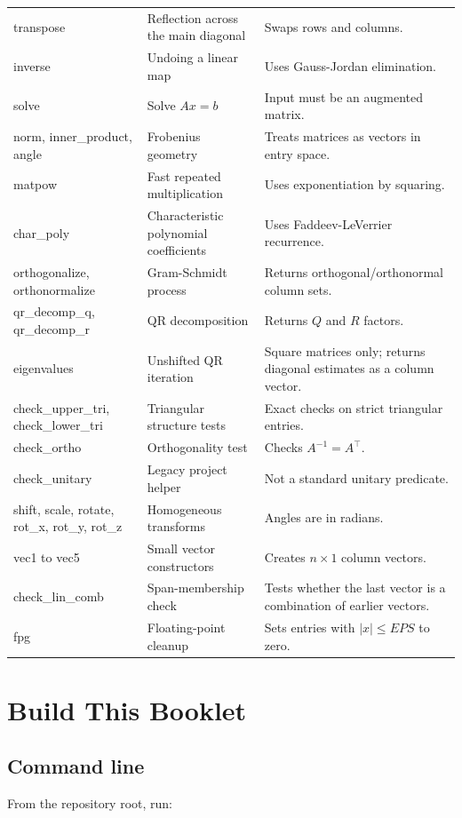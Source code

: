 \documentclass[11pt,a4paper,openany]{book}
\def\code#1{#1}%
\DeclareRobustCommand{\code}[1]{\texttt{\detokenize{#1}}}
\begin{document}
\begin{longtable}{@{}p{}p{}p{}@{}}
\code{transpose} & Reflection across the main diagonal & Swaps rows and columns. \\
\code{inverse} & Undoing a linear map & Uses Gauss-Jordan elimination. \\
\code{solve} & Solve \(Ax=b\) & Input must be an augmented matrix. \\
\code{norm}, \code{inner_product}, \code{angle} & Frobenius geometry & Treats matrices as vectors in entry space. \\
\code{matpow} & Fast repeated multiplication & Uses exponentiation by squaring. \\
\code{char_poly} & Characteristic polynomial coefficients & Uses Faddeev-LeVerrier recurrence. \\
\code{orthogonalize}, \code{orthonormalize} & Gram-Schmidt process & Returns orthogonal/orthonormal column sets. \\
\code{qr_decomp_q}, \code{qr_decomp_r} & QR decomposition & Returns \(Q\) and \(R\) factors. \\
\code{eigenvalues} & Unshifted QR iteration & Square matrices only; returns diagonal estimates as a column vector. \\
\code{check_upper_tri}, \code{check_lower_tri} & Triangular structure tests & Exact checks on strict triangular entries. \\
\code{check_ortho} & Orthogonality test & Checks \(A^{-1}=A^\top\). \\
\code{check_unitary} & Legacy project helper & Not a standard unitary predicate. \\
\code{shift}, \code{scale}, \code{rotate}, \code{rot_x}, \code{rot_y}, \code{rot_z} & Homogeneous transforms & Angles are in radians. \\
\code{vec1} to \code{vec5} & Small vector constructors & Creates \(n \times 1\) column vectors. \\
\code{check_lin_comb} & Span-membership check & Tests whether the last vector is a combination of earlier vectors. \\
\code{fpg} & Floating-point cleanup & Sets entries with \(|x| \le \code{EPS}\) to zero. \\
\bottomrule
\end{longtable}

\chapter{Build This Booklet}

\section{Command line}
From the repository root, run:
\end{document}
